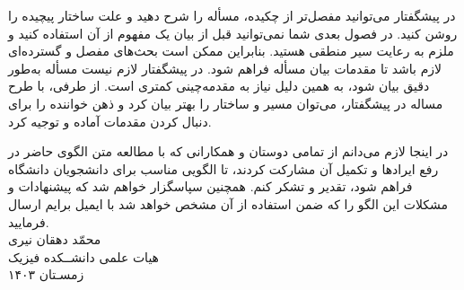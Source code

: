 در پیشگفتار می‌توانید مفصل‌تر از چکیده، مسأله را شرح دهید و علت ساختار پیچیده 
\thesis 
را روشن کنید. در فصول بعدی شما نمی‌توانید قبل از بیان یک مفهوم از آن استفاده کنید و ملزم به رعایت سیر منطقی هستید. بنابراین ممکن است بحث‌های مفصل و گسترده‌ای لازم باشد تا مقدمات بیان مسأله فراهم شود. در پیشگفتار لازم نیست مسأله به‌طور دقیق بیان شود، به همین دلیل نیاز به مقدمه‌چینی کمتری است. از طرفی، با طرح مساله در پیشگفتار، می‌توان مسیر و ساختار 
\thesis 
را بهتر بیان کرد و ذهن خواننده را برای دنبال کردن مقدمات آماده و توجیه کرد.

در اینجا لازم می‌دانم از تمامی دوستان و همکارانی که با مطالعه متن الگوی حاضر در رفع ایرادها و تکمیل آن مشارکت کردند، تا الگویی مناسب برای دانشجویان دانشگاه فراهم شود، تقدیر و تشکر کنم. همچنین سپاسگزار خواهم شد که پیشنهادات و مشکلات این الگو را که ضمن استفاده از آن  مشخص خواهد شد با ایمیل%
برایم ارسال فرمایید.\\[1em]
محمّد دهقان نیری\\
هیات علمی دانشــکده فیزیک\\
زمسـتان ۱۴۰۳
